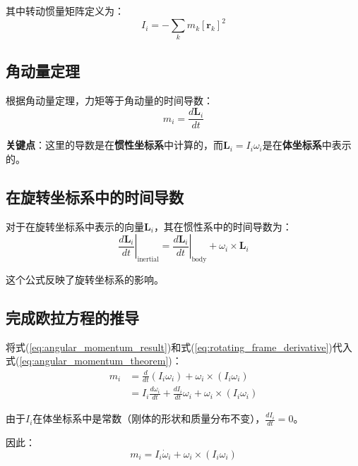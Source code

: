 \documentclass[12pt,a4paper]{article}
\begin{document}
其中转动惯量矩阵定义为：
\begin{equation}
I_i = -\sum_k m_k [\bm{r}_k]^2
\label{eq:inertia_matrix_definition}
\end{equation}

\subsection{角动量定理}

根据角动量定理，力矩等于角动量的时间导数：
\begin{equation}
m_i = \frac{d\bm{L}_i}{dt}
\label{eq:angular_momentum_theorem}
\end{equation}

\textbf{关键点}：这里的导数是在\textbf{惯性坐标系}中计算的，而$\bm{L}_i = I_i \omega_i$是在\textbf{体坐标系}中表示的。

\subsection{在旋转坐标系中的时间导数}

对于在旋转坐标系中表示的向量$\bm{L}_i$，其在惯性系中的时间导数为：
\begin{equation}
\left.\frac{d\bm{L}_i}{dt}\right|_{\text{inertial}} = \left.\frac{d\bm{L}_i}{dt}\right|_{\text{body}} + \omega_i \times \bm{L}_i
\label{eq:rotating_frame_derivative}
\end{equation}

这个公式反映了旋转坐标系的影响。

\subsection{完成欧拉方程的推导}

将式(\ref{eq:angular_momentum_result})和式(\ref{eq:rotating_frame_derivative})代入式(\ref{eq:angular_momentum_theorem})：
\begin{align}
m_i &= \frac{d}{dt}(I_i \omega_i) + \omega_i \times (I_i \omega_i) \\
&= I_i \frac{d\omega_i}{dt} + \frac{dI_i}{dt} \omega_i + \omega_i \times (I_i \omega_i)
\end{align}

由于$I_i$在体坐标系中是常数（刚体的形状和质量分布不变），$\frac{dI_i}{dt} = 0$。

因此：
\begin{equation}
m_i = I_i \dot{\omega}_i + \omega_i \times (I_i \omega_i)
\label{eq:euler_final}
\end{equation}
\end{document}
